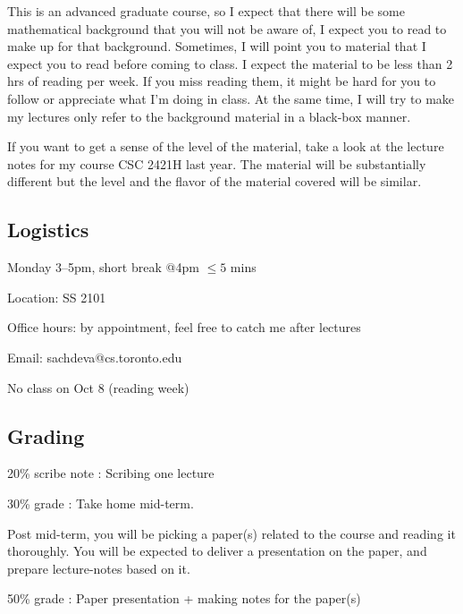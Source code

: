 \documentclass[11pt]{article}
\newenvironment{tight_itemize}{
\begin{itemize}
 \setlength{\itemsep}{2pt}
 \setlength{\parskip}{1pt}
}{\end{itemize}}
\begin{document}
This is an advanced graduate course, so I expect that there will be
some mathematical background that you will not be aware of, I expect
you to read to make up for that background. Sometimes, I will point
you to material that I expect you to read before coming to class. I
expect the material to be less than 2 hrs of reading per week. If you
miss reading them, it might be hard for you to follow or appreciate
what I'm doing in class. At the same time, I will try to make my
lectures only refer to the background material in a black-box manner.

If you want to get a sense of the level of the material, take a look
at the lecture notes for my course CSC 2421H last year. The material
will be substantially different but the level and the flavor of the
material covered will be similar.

\subsection{Logistics}
\begin{tight_itemize}
\item Monday 3--5pm, short break @4pm $\le 5$ mins
\item Location: SS 2101
\item Office hours: by appointment, feel free to catch me after
  lectures
\item Email: sachdeva@cs.toronto.edu
\item No class on Oct 8 (reading week)
\end{tight_itemize}

\subsection{Grading}
\label{sec:grading}
\begin{tight_itemize}
\item 20\% scribe note : Scribing one lecture
\item 30\% grade : Take home mid-term. 
\item Post mid-term, you will be picking a paper(s) related to the
  course and reading it thoroughly. You will be expected to deliver a
  presentation on the paper, and prepare lecture-notes based on it.
\item 50\% grade : Paper presentation + making notes for the paper(s)
\end{tight_itemize}
\end{document}
